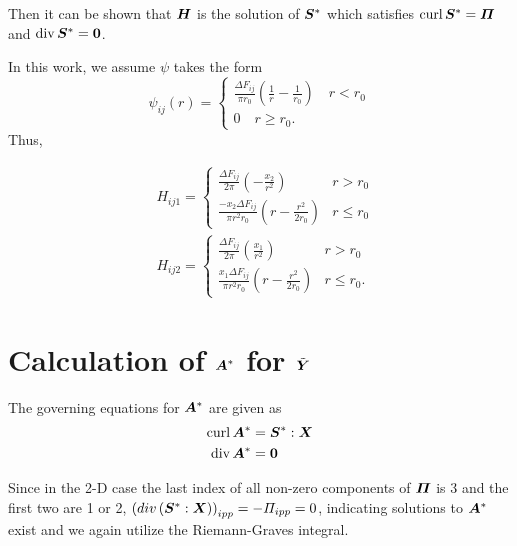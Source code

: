 \documentclass[11pt,letterpaper]{article}
\begin{document}
Then it can be shown that $\bfH$ is the solution of $\bfS^{*}$ which satisfies $\curl \bfS^{*} = \bfPi$ and $\divergence \bfS^{*} = \bf0$.

In this work, we assume $\psi$ takes the form
\begin{equation*}
\psi_{ij}(r) = 
\begin{cases}
\frac{\Delta F_{ij}}{\pi r_0} (\frac{1}{r} - \frac{1}{r_0}) \quad \text{$r < r_0$} \\
0 \quad \text{$r \ge r_0$}.
\end{cases}
\end{equation*}
Thus,

\begin{eqnarray*}
&H_{ij1} = 
\begin{cases}
\frac{\Delta F_{ij}}{2\pi}(-\frac{x_2}{r^2}) & r>r_0 \\
\frac{-x_2 \Delta F_{ij}}{\pi r^2 r_0} (r-\frac{r^2}{2r_0}) & r \le r_0
\end{cases} \\
&H_{ij2} = 
\begin{cases}
\frac{\Delta F_{ij}}{2\pi}(\frac{x_1}{r^2}) & r>r_0 \\
\frac{x_1 \Delta F_{ij}}{\pi r^2 r_0} (r-\frac{r^2}{2r_0})& r \le r_0.
\end{cases}
\end{eqnarray*}

\section{Calculation of $\bfA^*$ for $\tilde{\bfY}$} \label{sec:app2}

The governing equations for $\bfA^*$ are given as 
\begin{equation*}
\begin{aligned}
\curl \bfA^* & = \bfS^{*} :\bfX \\
\divergence \bfA^* & = \bf0
\end{aligned}
\end{equation*}

Since in the 2-D case the last index of all non-zero components of $\bfPi$ is 3 and the first two are 1 or 2, $\left(div \, (\bfS^{*}:\bfX)\right)_{ipp} = - \Pi_{ipp} = 0$, indicating solutions to $\bfA^*$ exist and we again utilize the Riemann-Graves integral.
\end{document}
